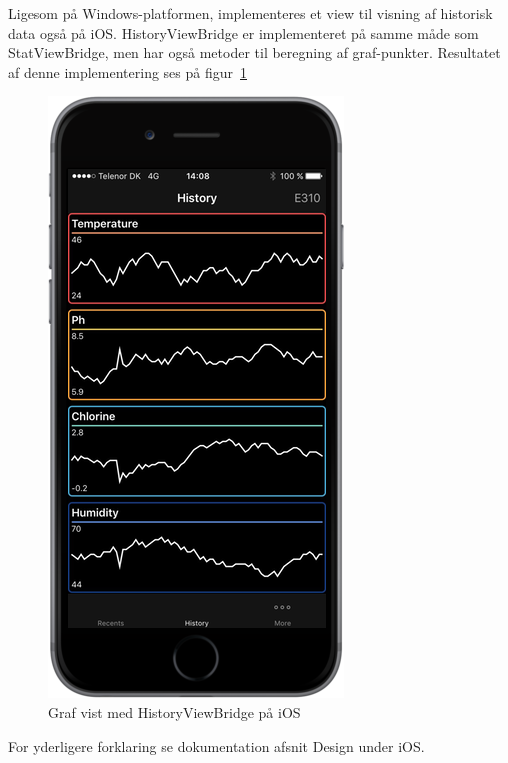 Ligesom på Windows-platformen, implementeres et view til visning af historisk data også på iOS. HistoryViewBridge er implementeret på samme måde som StatViewBridge, men har også metoder til beregning af graf-punkter. Resultatet af denne implementering ses på figur~\ref{fig:ios_imp_historyview}

\begin{figure}
\centering
\includegraphics[width=0.4\linewidth]{figs/implementering/ios_imp_historyview}
\caption{Graf vist med HistoryViewBridge på iOS}
\label{fig:ios_imp_historyview}
\end{figure}

For yderligere forklaring se dokumentation afsnit Design under iOS.